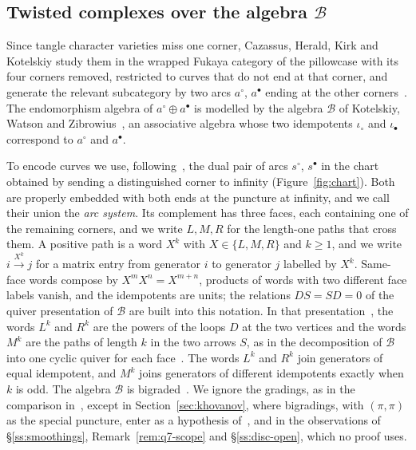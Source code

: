 \subsection{Twisted complexes over the algebra \texorpdfstring{$\mathcal B$}{B}}\label{ss:kwz}
Since tangle character varieties miss one corner, Cazassus, Herald, Kirk and Kotelskiy study them in the wrapped
Fukaya category of the pillowcase with its four corners removed, restricted to curves that do not end at that corner,
and generate the relevant subcategory by two arcs $a^\circ$, $a^\bullet$ ending at the other
corners~\cite[\S11.5]{CHKK}. The endomorphism algebra of
$a^\circ\oplus a^\bullet$ is modelled by the algebra $\mathcal B$ of Kotelskiy, Watson and
Zibrowius~\cite{KWZ}, an associative algebra whose two idempotents $\iota_\circ$ and $\iota_\bullet$
correspond to $a^\circ$ and $a^\bullet$.

To encode curves we use, following~\cite{KWZ}, the dual pair of arcs $s^\circ$, $s^\bullet$ in the chart obtained
by sending a distinguished corner to infinity (Figure~\ref{fig:chart}). Both are properly embedded with both ends
at the puncture at infinity, and we call their union the \emph{arc system}. Its complement has three faces, each
containing one of the remaining corners, and we write $L,M,R$ for the length-one paths that cross them. A positive
path is a word $X^k$ with $X\in\{L,M,R\}$ and $k\ge1$, and we write $i\xrightarrow{X^k}j$ for a matrix entry from
generator $i$ to generator $j$ labelled by $X^k$. Same-face words compose by $X^mX^n=X^{m+n}$, products of words with
two different face labels vanish, and the idempotents are units; the relations $DS=SD=0$ of the quiver
presentation of $\mathcal B$ are built into this notation. In that presentation~\cite[Def.~4.19]{KWZ}, the words
$L^k$ and $R^k$ are the powers of the loops $D$ at the two vertices and the words $M^k$ are the paths of length $k$
in the two arrows $S$, as in the decomposition of $\mathcal B$ into one cyclic quiver for each
face~\cite[Exs.~5.5 and~5.6]{KWZ}. The words $L^k$ and $R^k$ join generators of equal
idempotent, and $M^k$ joins generators of different idempotents exactly when $k$ is odd. The algebra $\mathcal B$ is
bigraded~\cite{KWZ}. We ignore the gradings, as in the comparison in~\cite[\S11.5]{CHKK}, except in
Section~\ref{sec:khovanov}, where bigradings, with $(\pi,\pi)$ as the special puncture, enter as a hypothesis of~\cite[Thm.~5.25]{KWZ}, and in the observations of \S\ref{ss:smoothings}, Remark~\ref{rem:q7-scope} and \S\ref{ss:disc-open}, which no proof uses.

